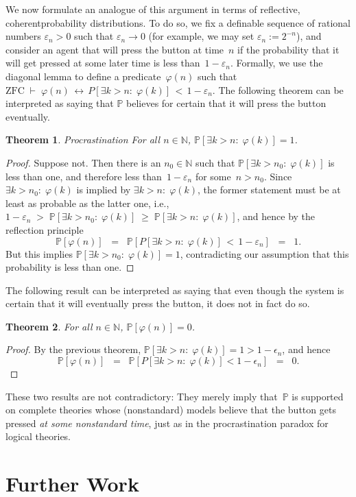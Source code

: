 \documentclass[12pt]{article}
\newcommand{\PP}{\mathbb{P}}
\newcommand{\vp}{\varphi}
\newcommand{\NN}{\mathbb{N}}
\newcommand{\zfc}{\mathrm{ZFC}}
\newcommand{\coh}{coherent}
\theoremstyle{plain}
\newtheorem{theorem}{Theorem}[subsection]
\theoremstyle{definition}
\theoremstyle{remark}
\begin{document}
We now formulate an analogue of this argument in terms of reflective, \coh probability  distributions.
To do so, we fix a definable sequence of rational numbers $\varepsilon_n > 0$ such that $\varepsilon_n\to0$ (for example, we may set $\varepsilon_n := 2^{-n}$), and consider an agent that will press the button at time~$n$ if the probability that it will get pressed at some later time is less than~$1-\varepsilon_n$. Formally, we use the diagonal lemma to define a predicate~$\vp(n)$ such that $\zfc\;\vdash\;\vp(n)\,\leftrightarrow\, P[\exists k>n{:}\;\vp(k)] \,<\, 1 - \varepsilon_n$.
The following theorem can be interpreted as saying that $\PP$ believes for certain that it will press the button eventually.
\begin{theorem} \emph{Procrastination}
For all $n\in\NN$, $\PP[\exists k>n{:}\;\vp(k)] = 1$.
\end{theorem}
\begin{proof}
Suppose not. Then there is an $n_0\in\NN$ such that $\PP[\exists k>n_0{:}\;\vp(k)]$ is less than one, and therefore less than~$1 - \varepsilon_n$ for some~$n>n_0$. Since $\exists k>n_0{:}\;\vp(k)$ is implied by $\exists k>n{:}\; \vp(k)$, the former statement must be at least as probable as the latter one, i.e., $1 - \varepsilon_n \;>\; \PP[\exists k>n_0{:}\; \vp(k)] \;\ge\; \PP[\exists k>n{:}\;\vp(k)]$, and hence by the reflection principle
\[
\PP[\vp(n)] \;\;=\;\; \PP[P[\exists k>n{:}\;\vp(k)] \,<\, 1 - \varepsilon_n] \;\;=\;\; 1.
\]
But this implies $\PP[\exists k>n_0{:}\;\vp(k)] = 1$, contradicting our assumption that this probability is less than one.
\end{proof}
The following result can be interpreted as saying that even though the system is certain that it will eventually press the button, it does not in fact do so.
\begin{theorem}
For all $n\in\NN$, $\PP[\vp(n)] = 0$.
\end{theorem}
\begin{proof}
By the previous theorem, $\PP[\exists k>n{:}\;\vp(k)] = 1 > 1 - \epsilon_n$, and hence
\[
\PP[\vp(n)] \;\;=\;\; \PP[P[\exists k>n{:}\;\vp(k)] < 1 - \epsilon_n] \;\;=\;\; 0.
\]
\end{proof}
These two results are not contradictory: They merely imply that~$\PP$ is supported on complete theories whose (nonstandard) models believe that the button gets pressed \emph{at some nonstandard time}, just as in the procrastination paradox for logical theories.
\section{Further Work}
\label{further-work}
\end{document}
